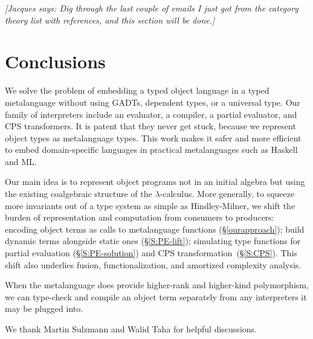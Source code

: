 \documentclass[preprint]{sigplanconf}
\newcommand{\jacques}[1]{{\it [Jacques says: #1]}}
\begin{document}
\jacques{Dig through the last couple of emails I just got from the
category theory list with references, and this section will be done.}

\section{Conclusions}\label{conclusion}

We solve the problem of embedding a typed object language in a typed
metalanguage without using GADTs, dependent types, or a universal type.
Our family of interpreters include an evaluator, a compiler, a partial
evaluator, and CPS transformers.  It is patent that they never get stuck,
because we represent object types as metalanguage types.  This work
makes it safer and more efficient to embed domain\hyp specific languages
in practical metalanguages such as Haskell and ML\@.

Our main idea is to represent object programs not in an initial algebra
but using the existing coalgebraic structure of the $\lambda$-calculus.
More generally, to squeeze more invariants out of a type system as
simple as Hindley-Milner, we shift the burden of representation and
computation from consumers to producers: encoding object terms as calls
to metalanguage functions (\S\ref{ourapproach}); build dynamic terms
alongside static ones (\S\ref{S:PE-lift}); simulating type functions for
partial evaluation (\S\ref{S:PE-solution}) and CPS
transformation~(\S\ref{S:CPS}).  This shift also underlies fusion,
functionalization, and amortized complexity analysis.

When the metalanguage does provide higher-rank and higher-kind
polymorphism, we can type-check and compile an object term separately
from any interpreters it may be plugged into.

\acks%
We thank Martin Sulzmann and Walid Taha 
for helpful discussions.


\bibsep=0pt

\end{document}

